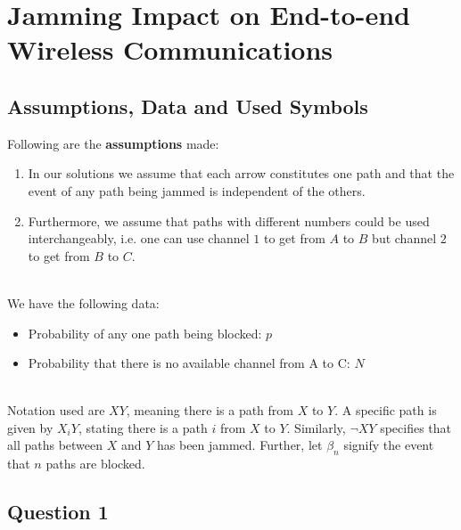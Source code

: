 \documentclass{article}
\begin{document}
\newpage
\section{Jamming Impact on End-to-end Wireless Communications}
\subsection*{Assumptions, Data and Used Symbols}

Following are the \textbf{assumptions} made:

\begin{enumerate}
    \item In our solutions we assume that each arrow constitutes one path and that the event of any path being jammed is independent of the others.
    \item Furthermore, we assume that paths with different numbers could be used interchangeably, i.e. one can use channel $1$ to get from $A$ to $B$ but channel $2$ to get from $B$ to $C$.
\end{enumerate}
\\
We have the following data:

\begin{itemize}
    \item Probability of any one path being blocked: $p$
    \item Probability that there is no available channel from A to C: $N$
\end{itemize}
\\
Notation used are $XY$, meaning there is a path from $X$ to $Y$.
A specific path is given by $X _i Y$, stating there is a path $i$ from $X$ to $Y$.
Similarly, $\neg XY$ specifies that all paths between $X$ and $Y$ has been jammed.
Further, let $\beta_n$ signify the event that $n$ paths are blocked.

\subsection*{Question 1}
\end{document}
